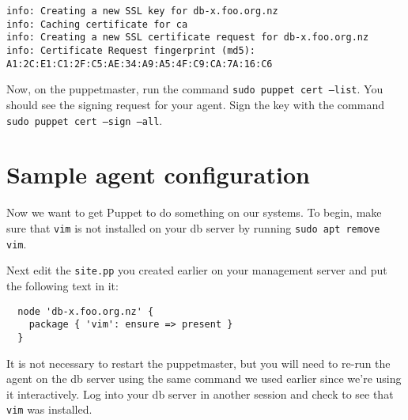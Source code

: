 \documentclass{article}
\begin{document}
\begin{verbatim}
info: Creating a new SSL key for db-x.foo.org.nz
info: Caching certificate for ca
info: Creating a new SSL certificate request for db-x.foo.org.nz
info: Certificate Request fingerprint (md5): A1:2C:E1:C1:2F:C5:AE:34:A9:A5:4F:C9:CA:7A:16:C6

\end{verbatim}

Now, on the puppetmaster, run the command \texttt{sudo puppet cert --list}.  You should see the signing request for your agent.  Sign the key with the command \texttt{ sudo puppet cert --sign --all}.

\section{Sample agent configuration}
Now we want to get Puppet to do something on our systems.  To begin, make sure that \texttt{vim} is not installed on your db server by running \texttt{sudo apt remove vim}.

Next edit the \texttt{site.pp} you created earlier on your management server and put the following text in it:
\begin{verbatim}
  node 'db-x.foo.org.nz' {
    package { 'vim': ensure => present }
  }
\end{verbatim}


It is not necessary to restart the puppetmaster, but you will need to re-run the agent on the db server using the same command we used earlier since we're using it interactively. Log into your db server in another session and check to see that \texttt{vim} was installed.
\end{document}
